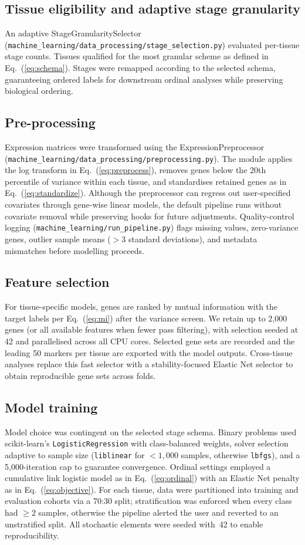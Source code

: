 \documentclass[11pt]{article}
\begin{document}
\subsection{Tissue eligibility and adaptive stage granularity}
An adaptive StageGranularitySelector (\texttt{machine\_learning/data\_processing/stage\_selection.py}) evaluated per-tissue stage counts. Tissues qualified for the most granular scheme as defined in Eq.~(\ref{eq:schema}). Stages were remapped according to the selected schema, guaranteeing ordered labels for downstream ordinal analyses while preserving biological ordering.

\subsection{Pre-processing}
Expression matrices were transformed using the ExpressionPreprocessor (\texttt{machine\_learning/data\_processing/preprocessing.py}). The module applies the log transform in Eq.~(\ref{eq:preprocess}), removes genes below the 20th percentile of variance within each tissue, and standardises retained genes as in Eq.~(\ref{eq:standardize}). Although the preprocessor can regress out user-specified covariates through gene-wise linear models, the default pipeline runs without covariate removal while preserving hooks for future adjustments. Quality-control logging (\texttt{machine\_learning/run\_pipeline.py}) flags missing values, zero-variance genes, outlier sample means ($>3$ standard deviations), and metadata mismatches before modelling proceeds.

\subsection{Feature selection}
For tissue-specific models, genes are ranked by mutual information with the target labels per Eq.~(\ref{eq:mi}) after the variance screen. We retain up to 2{,}000 genes (or all available features when fewer pass filtering), with selection seeded at 42 and parallelised across all CPU cores. Selected gene sets are recorded and the leading 50 markers per tissue are exported with the model outputs. Cross-tissue analyses replace this fast selector with a stability-focused Elastic Net selector to obtain reproducible gene sets across folds.

\subsection{Model training}
Model choice was contingent on the selected stage schema. Binary problems used scikit-learn's \texttt{LogisticRegression} with class-balanced weights, solver selection adaptive to sample size (\texttt{liblinear} for $<1{,}000$ samples, otherwise \texttt{lbfgs}), and a 5{,}000-iteration cap to guarantee convergence. Ordinal settings employed a cumulative link logistic model as in Eq.~(\ref{eq:ordinal}) with an Elastic Net penalty as in Eq.~(\ref{eq:objective}). For each tissue, data were partitioned into training and evaluation cohorts via a 70:30 split; stratification was enforced when every class had $\geq 2$ samples, otherwise the pipeline alerted the user and reverted to an unstratified split. All stochastic elements were seeded with~42 to enable reproducibility.
\end{document}
